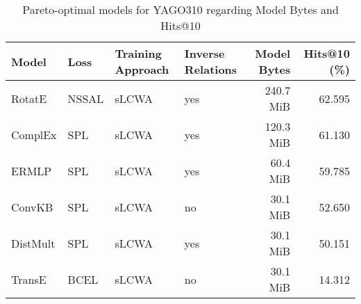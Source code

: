 \begin{table}[H]
\centering
\caption{Pareto-optimal models for YAGO310 regarding Model Bytes and Hits@10}
\label{tab:skyline_yago310_model_bytes}
\begin{tabular}{llllrr}
\toprule
    Model &   Loss & Training Approach & Inverse Relations & Model Bytes &  Hits@10 (\%) \\
\midrule
   RotatE &  NSSAL &             sLCWA &               yes &   240.7 MiB &       62.595 \\
  ComplEx &    SPL &             sLCWA &               yes &   120.3 MiB &       61.130 \\
    ERMLP &    SPL &             sLCWA &               yes &    60.4 MiB &       59.785 \\
   ConvKB &    SPL &             sLCWA &                no &    30.1 MiB &       52.650 \\
 DistMult &    SPL &             sLCWA &               yes &    30.1 MiB &       50.151 \\
   TransE &   BCEL &             sLCWA &                no &    30.1 MiB &       14.312 \\
\bottomrule
\end{tabular}
\end{table}

